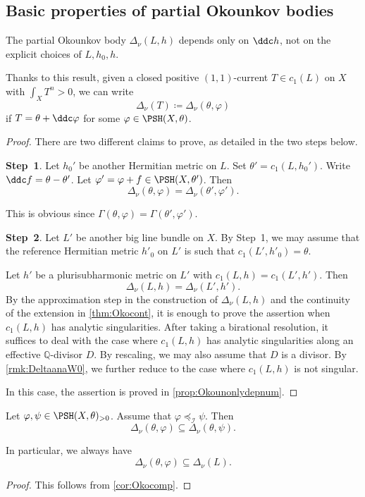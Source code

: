 \subsection{Basic properties of partial Okounkov bodies}
\label{subsec:pob_prop}

\begin{proposition}\label{prop:Okocurrent}
	The partial Okounkov body $\Delta_{\nu}(L,h)$ depends only on $\ddc h$, not on the explicit choices of $L,h_0,h$.
\end{proposition}
Thanks to this result, given a closed positive $(1,1)$-current $T\in c_1(L)$ on $X$ with $\int_X T^n>0$, we can write
\[
\Delta_{\nu}(T)\coloneqq \Delta_{\nu}(\theta,\varphi)
\]
if $T=\theta+\ddc\varphi$ for some $\varphi\in \PSH(X,\theta)$.
\begin{proof}
	There are two different claims to prove, as detailed in the two steps below.

\textbf{Step~1}. Let $h_0'$ be another Hermitian metric on $L$. Set $\theta'=c_1(L,h_0')$. Write $\ddc f=\theta-\theta'$.
	Let $\varphi'=\varphi+f\in \PSH(X,\theta')$. Then
	\begin{equation}\label{eq:DeltaDelta1}
		\Delta_{\nu}(\theta,\varphi)=\Delta_{\nu}(\theta',\varphi').
	\end{equation}

 This is obvious since $\Gamma(\theta,\varphi)=\Gamma(\theta',\varphi')$.

 \textbf{Step~2}. Let $L'$ be another big line bundle on $X$. By Step~1, we may assume that the reference Hermitian metric $h'_0$ on $L'$ is such that $c_1(L',h'_0)=\theta$.

 Let $h'$ be a plurisubharmonic metric on $L'$ with $c_1(L,h)=c_1(L',h')$. Then
 \[
 \Delta_{\nu}(L,h)=\Delta_{\nu}(L',h').
 \]
 By the approximation step in the construction of $\Delta_\nu(L,h)$ and the continuity of the extension in \cref{thm:Okocont}, it is enough to prove the assertion when $c_1(L,h)$ has analytic singularities. After taking a birational resolution, it suffices to deal with the case where $c_1(L,h)$ has analytic singularities along an effective $\mathbb{Q}$-divisor $D$. By rescaling, we may also assume that $D$ is a divisor. By \cref{rmk:DeltaanaW0}, we further reduce to the case where $c_1(L,h)$ is not singular.

In this case, the assertion is proved in \cref{prop:Okounonlydepnum}.
\end{proof}

\begin{proposition}\label{prop:IcompimplyDeltacomp}
	Let $\varphi,\psi\in \PSH(X,\theta)_{>0}$. Assume that $\varphi\preceq_{\mathcal{I}} \psi$. Then
	\begin{equation}\label{eq:Deltacomp}
		\Delta_{\nu}(\theta,\varphi)  \subseteq \Delta_{\nu}(\theta,\psi).
	\end{equation}
\end{proposition}
In particular, we always have
\[
\Delta_{\nu}(\theta,\varphi)\subseteq \Delta_{\nu}(L).
\]
\begin{proof}
	This follows from \cref{cor:Okocomp}.
\end{proof}




